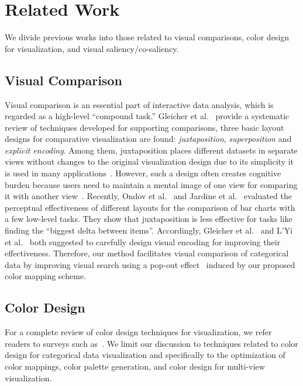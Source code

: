 \section {Related Work}
We divide previous works into those related to visual comparisons, color design for visualization, and visual saliency/co-saliency.
\subsection{Visual Comparison}
Visual comparison is an essential part of interactive data analysis, which is regarded as a high-level ``compound task.'' Gleicher et al.~\cite{Gleicher11} provide a systematic review of techniques developed for supporting comparisons, three basic layout designs for comparative visualization are found: \emph{juxtaposition}, \emph{superposition} and \emph{explicit encoding}. Among them, juxtaposition places different datasets in separate
views without changes to the original visualization design due to its simplicity it is used in many applications~\cite{munzner2003treejuxtaposer,Albers11,Lobo15}. However, such a design often creates cognitive burden because users need to maintain a mental image of one view for comparing it with another view~\cite{LYi21}. Recently, Ondov et al.~\cite{Ondov19} and Jardine et al.~\cite{jardine2019perceptual} evaluated the perceptual effectiveness of different layouts for the comparison of bar charts with a few low-level tasks. They show that juxtaposition is less effective for tasks like finding the ``biggest delta between items''.
Accordingly, Gleicher et al.~\cite{Gleicher11} and  L'Yi et al.~\cite{LYi21} both suggested to carefully design visual encoding for improving their effectiveness. Therefore, our method facilitates visual comparison of categorical data by improving visual search using a pop-out effect~\cite{enns1990three} induced by our proposed color mapping scheme.

\subsection{Color Design}
For a complete review of color design techniques for visualization, we refer readers to surveys such as~\cite{Tominski08,Zhou16}. We limit our discussion to techniques related to color design for categorical data visualization and specifically to the optimization of color mappings, color palette generation, and color design for multi-view visualization.

